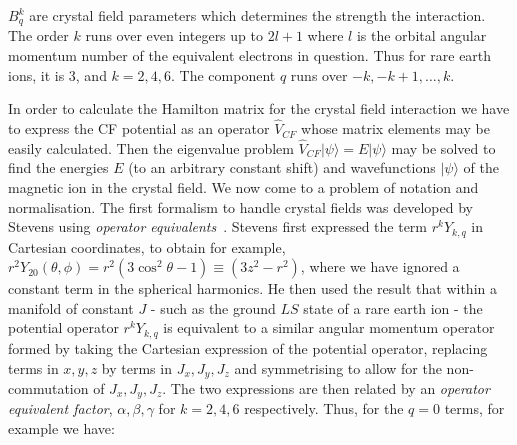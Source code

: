 \documentclass[12pt,onecolumn,tightenlines,aps,amsmath,floatfix,notitlepage,nofootinbib]{revtex4}
\newcommand{\ket}[1]{|#1\rangle}
\begin{document}
\noindent $B_q^k$ are crystal field parameters which determines the strength the interaction. The order $k$ runs over even integers up to $2l+1$ where $l$ is the orbital angular momentum number of the equivalent electrons in question. Thus for rare earth ions, it is 3, and $k=2,4,6$. The component $q$ runs over $-k,-k+1,\ldots,k$.

In order to calculate the Hamilton matrix for the crystal field interaction we have to express the CF potential as an operator $\hat{V}_{CF}$ whose matrix elements may be easily calculated. Then the eigenvalue problem $\hat{V}_{CF} \ket{\psi} = E \ket{\psi}$ may be solved to find the energies $E$ (to an arbitrary constant shift) and wavefunctions $\ket{\psi}$ of the magnetic ion in the crystal field. We now come to a problem of notation and normalisation. The first formalism to handle crystal fields was developed by Stevens using \emph{operator equivalents}~\cite{Stevens52}. Stevens first expressed the term $r^k Y_{k,q}$ in Cartesian coordinates, to obtain for example, $r^2 Y_{20}(\theta,\phi) = r^2 (3\cos^2\theta - 1) \equiv (3z^2 - r^2)$, where we have ignored a constant term in the spherical harmonics. He then used the result that within a manifold of constant $J$ - such as the ground $LS$ state of a rare earth ion - the potential operator $r^k Y_{k,q}$ is equivalent to a similar angular momentum operator formed by taking the Cartesian expression of the potential operator, replacing terms in $x, y, z$ by terms in $J_x, J_y, J_z$ and symmetrising to allow for the non-commutation of $J_x, J_y, J_z$. The two expressions are then related by an \emph{operator equivalent factor}, $\alpha, \beta, \gamma$ for $k=2,4,6$ respectively. Thus, for the $q=0$ terms, for example we have:
\end{document}
